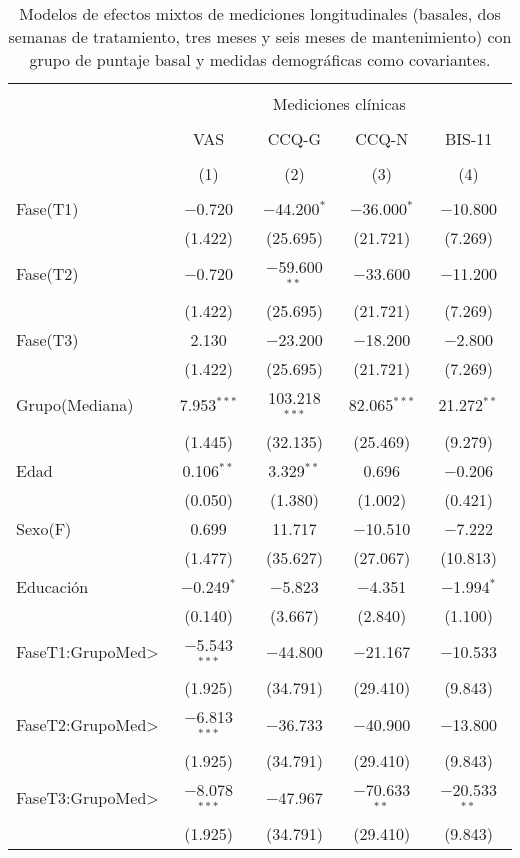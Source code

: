 \begin{table}[!htbp] \centering
    \small
  \caption{Modelos de efectos mixtos de mediciones longitudinales (basales, dos semanas de tratamiento, tres meses y seis meses de mantenimiento) con grupo de puntaje basal y medidas demográficas como covariantes.}
  \label{tab:clin3}
\begin{tabular}{@{\extracolsep{5pt}}lcccc}
\\[-1.8ex]\hline
\hline \\[-1.8ex]
 & \multicolumn{4}{c}{Mediciones clínicas } \\
\cline{2-5}
\\[-1.8ex] & VAS & CCQ-G & CCQ-N & BIS-11\\
\\[-1.8ex] & (1) & (2) & (3) & (4)\\
\hline \\[-1.8ex]
  Fase(T1) & $-$0.720 & $-$44.200$^{*}$ & $-$36.000$^{*}$ & $-$10.800 \\
  & (1.422) & (25.695) & (21.721) & (7.269) \\
  Fase(T2) & $-$0.720 & $-$59.600$^{**}$ & $-$33.600 & $-$11.200 \\
  & (1.422) & (25.695) & (21.721) & (7.269) \\
  Fase(T3) & 2.130 & $-$23.200 & $-$18.200 & $-$2.800 \\
  & (1.422) & (25.695) & (21.721) & (7.269) \\
  Grupo(Mediana) & 7.953$^{***}$ & 103.218$^{***}$ & 82.065$^{***}$ & 21.272$^{**}$ \\
  & (1.445) & (32.135) & (25.469) & (9.279) \\
  Edad & 0.106$^{**}$ & 3.329$^{**}$ & 0.696 & $-$0.206 \\
  & (0.050) & (1.380) & (1.002) & (0.421) \\
  Sexo(F) & 0.699 & 11.717 & $-$10.510 & $-$7.222 \\
  & (1.477) & (35.627) & (27.067) & (10.813) \\
  Educación & $-$0.249$^{*}$ & $-$5.823 & $-$4.351 & $-$1.994$^{*}$ \\
  & (0.140) & (3.667) & (2.840) & (1.100) \\
  FaseT1:GrupoMed\textgreater  & $-$5.543$^{***}$ & $-$44.800 & $-$21.167 & $-$10.533 \\
  & (1.925) & (34.791) & (29.410) & (9.843) \\
  FaseT2:GrupoMed\textgreater  & $-$6.813$^{***}$ & $-$36.733 & $-$40.900 & $-$13.800 \\
  & (1.925) & (34.791) & (29.410) & (9.843) \\
  FaseT3:GrupoMed\textgreater  & $-$8.078$^{***}$ & $-$47.967 & $-$70.633$^{**}$ & $-$20.533$^{**}$ \\
  & (1.925) & (34.791) & (29.410) & (9.843) \\


\end{tabular}
\end{table}
